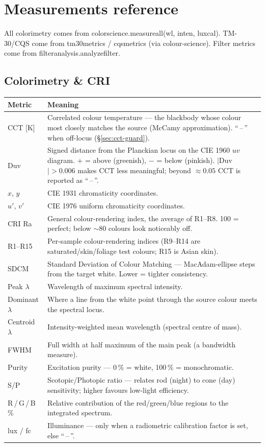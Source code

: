 \documentclass[12pt,a4paper]{article}
\DeclareRobustCommand{\code}[1]{{\ttfamily\small\def\_{\rawus\allowbreak}#1}}
\begin{document}
\section{Measurements reference}\label{sec:metrics}
All colorimetry comes from \code{color\_science.measure\_all(wl, inten, lux\_cal)}.
TM-30/CQS come from \code{tm30\_metrics} / \code{cqs\_metrics} (via colour-science).
Filter metrics come from \code{filter\_analysis.analyze\_filter}.

\subsection{Colorimetry \& CRI}
\begin{longtable}{@{}p{3.0cm}p{11.8cm}@{}}
\toprule \textbf{Metric} & \textbf{Meaning}\\ \midrule\endhead
CCT [K] & Correlated colour temperature --- the blackbody whose colour most closely matches the source (McCamy approximation). ``\,--\,'' when off-locus (\S\ref{sec:cct-guard}).\\
Duv & Signed distance from the Planckian locus on the CIE 1960 $uv$ diagram. $+$ = above (greenish), $-$ = below (pinkish). $|$Duv$|>0.006$ makes CCT less meaningful; beyond $\approx0.05$ CCT is reported as ``\,--\,''.\\
$x$, $y$ & CIE 1931 chromaticity coordinates.\\
$u'$, $v'$ & CIE 1976 uniform chromaticity coordinates.\\
CRI Ra & General colour-rendering index, the average of R1--R8. 100 = perfect; below $\sim$80 colours look noticeably off.\\
R1--R15 & Per-sample colour-rendering indices (R9--R14 are saturated/skin/foliage test colours; R15 is Asian skin).\\
SDCM & Standard Deviation of Colour Matching --- MacAdam-ellipse steps from the target white. Lower = tighter consistency.\\
Peak $\lambda$ & Wavelength of maximum spectral intensity.\\
Dominant $\lambda$ & Where a line from the white point through the source colour meets the spectral locus.\\
Centroid $\lambda$ & Intensity-weighted mean wavelength (spectral centre of mass).\\
FWHM & Full width at half maximum of the main peak (a bandwidth measure).\\
Purity & Excitation purity --- 0\,\% = white, 100\,\% = monochromatic.\\
S/P & Scotopic/Photopic ratio --- relates rod (night) to cone (day) sensitivity; higher favours low-light efficiency.\\
R\,/\,G\,/\,B \% & Relative contribution of the red/green/blue regions to the integrated spectrum.\\
lux / fc & Illuminance --- only when a radiometric calibration factor is set, else ``\,--\,''.\\
\bottomrule
\end{longtable}
\end{document}
